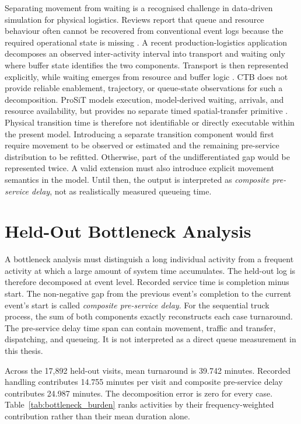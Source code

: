 Separating movement from waiting is a recognised challenge in data-driven
simulation for physical logistics. Reviews report that queue and resource
behaviour often cannot be recovered from conventional event logs because the
required operational state is missing
\cite{Sulis2026SimulationReview,Grobis2025ProductionLogistics}. A recent
production-logistics application decomposes an observed inter-activity interval
into transport and waiting only where buffer state identifies the two
components. Transport is then represented explicitly, while waiting emerges
from resource and buffer logic \cite{Grobis2026SimulationDevelopment}. CTB does
not provide reliable enablement, trajectory, or queue-state observations for
such a decomposition. ProSiT models execution, model-derived waiting, arrivals, and
resource availability, but provides no separate timed spatial-transfer
primitive \cite{Vinci2026prosit}. Physical transition time is therefore not
identifiable or directly executable within the present model. Introducing a
separate transition component would first require movement to be observed or
estimated and the remaining pre-service distribution to be refitted. Otherwise,
part of the undifferentiated gap would be represented twice. A valid extension
must also introduce explicit movement semantics in the model. Until then, the
output is interpreted as \emph{composite pre-service delay}, not as realistically
measured queueing time.

\section{Held-Out Bottleneck Analysis}
\label{sec:results_bottlenecks}

A bottleneck analysis must distinguish a long individual activity from a
frequent activity at which a large amount of system time accumulates. The
held-out log is therefore decomposed at event level. Recorded service time
is completion minus start. The non-negative gap from the previous event's
completion to the current event's start is called \emph{composite pre-service
delay}. For the sequential truck process, the sum of both components exactly
reconstructs each case turnaround. The pre-service delay time span can contain
movement, traffic and transfer, dispatching, and queueing. It is not interpreted
as a direct queue measurement in this thesis.

Across the 17,892 held-out visits, mean turnaround is 39.742 minutes. Recorded
handling contributes 14.755 minutes per visit and composite pre-service delay
contributes 24.987 minutes. The decomposition error is zero for every case.
Table~\ref{tab:bottleneck_burden} ranks activities by their frequency-weighted
contribution rather than their mean duration alone.

